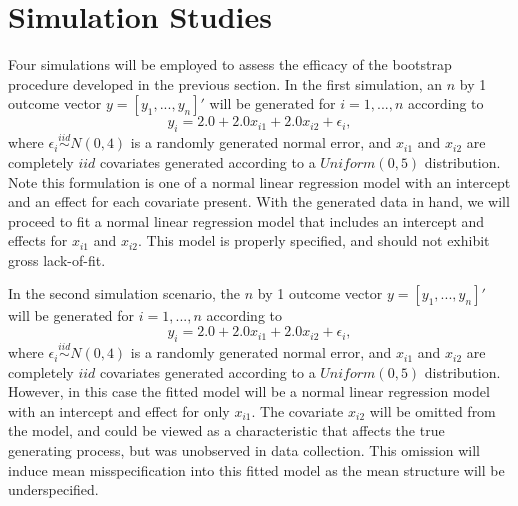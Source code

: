 \documentclass[12pt]{article} %
\theoremstyle{definition}
\begin{document}


\section{Simulation Studies}

Four simulations will be employed to assess the efficacy of the bootstrap procedure developed in the previous section. In the first simulation, an $n$ by 1 outcome vector $y = [y_1,...,y_n]'$ will
be generated for $i = 1,...,n$ according to
\begin{equation*}
	y_i = 2.0 + 2.0 x_{i1} + 2.0 x_{i2} + \epsilon_i , 
\end{equation*}
where $\epsilon_i \stackrel{iid}{\sim} N(0,4)$ is a randomly generated normal error, and $x_{i1}$ and $x_{i2}$ are completely $iid$ covariates generated according to
a $Uniform(0,5)$ distribution. Note this formulation is one of a normal linear regression model with an intercept and an effect for each covariate present. With the generated data in hand, we will
proceed to fit a normal linear regression model that includes an intercept and effects for $x_{i1}$ and $x_{i2}$. This model is properly specified, and should not exhibit gross lack-of-fit.

In the second simulation scenario, the $n$ by 1 outcome vector $y = [y_1,...,y_n]'$ will be generated for $i = 1,...,n$ according to
\begin{equation*}
	y_i = 2.0 + 2.0 x_{i1} + 2.0 x_{i2} + \epsilon_i , 
\end{equation*}
where $\epsilon_i \stackrel{iid}{\sim} N(0,4)$ is a randomly generated normal error, and $x_{i1}$ and $x_{i2}$ are completely $iid$ covariates generated according to
a $Uniform(0,5)$ distribution. However, in this case the fitted model will be a normal linear regression model with an intercept and effect for only
$x_{i1}$. The covariate $x_{i2}$ will be omitted from the model, and could be viewed as a characteristic that affects the true generating process, but
was unobserved in data collection. This omission will induce mean misspecification into this fitted model as the mean structure will be underspecified.
\end{document}
